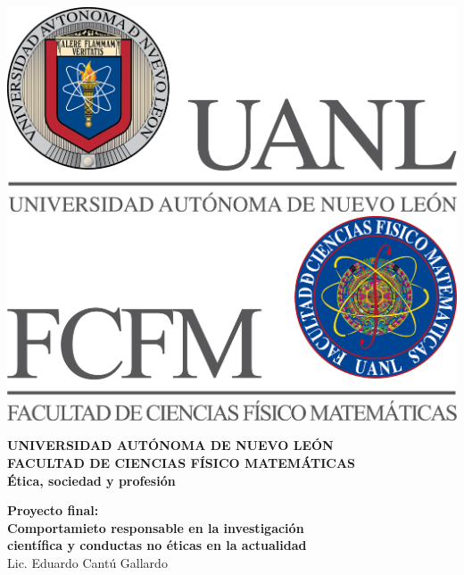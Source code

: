 \begin{titlepage}
\begin{center}
\includegraphics[scale=0.40]{../../Logos/uanl.png} 
\hspace{2.5cm}
\includegraphics[scale=0.40]{../../Logos/fcfm.png}
\end{center}
\vspace{1.5cm}
\begin{center}
\large{\textbf{
UNIVERSIDAD AUTÓNOMA DE NUEVO LEÓN\\
FACULTAD DE CIENCIAS
FÍSICO MATEMÁTICAS}}\\
\vspace{2.5cm}
\Large{\textbf{Ética, sociedad y profesión}} \vspace{1cm}\\
\begin{large}
\textbf{Proyecto final: \vspace{0.5cm}\\ Comportamieto responsable en la 
investigación\\ científica y conductas no éticas  en la actualidad\vspace{0.5cm}\\}
Lic. Eduardo Cantú Gallardo\\
\end{large}
\vspace{3.5cm}
\begin{minipage}{0.6\linewidth}

\end{minipage}
\end{center}
\end{titlepage}
